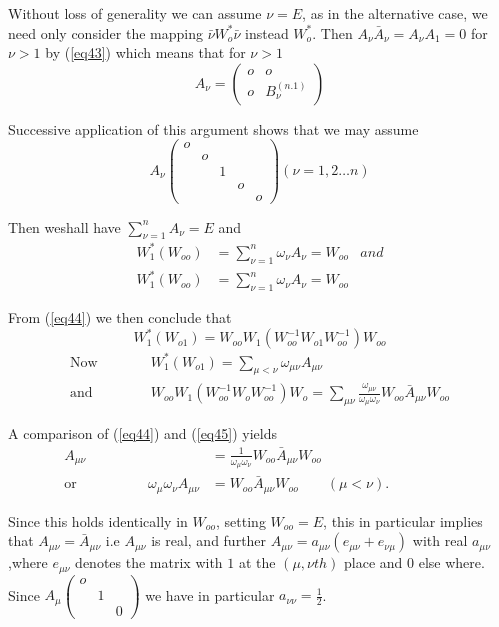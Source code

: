 Without loss of generality we can assume $\nu = E$, as in the
 alternative case, we need only consider the mapping $\bar{\nu} W_o^*
 \bar{\nu}$ instead $W_o^*$.   Then $A_\nu \bar{A}_\nu = A_\nu A_1 =
 0$ for $\nu > 1$ by (\ref{eq43}) which means that for $\nu > 1$  
 $$
 A_\nu = \begin{pmatrix}  o & o \\ o & B^{(n.1)}_\nu\end{pmatrix} 
 $$
 
 Successive application of this argument shows that we may assume
 $$
 A_\nu \begin{pmatrix} o & & & & \\ & o & & & \\ & & 1 & \\ & & &
   o\\ & & & & o\end{pmatrix} (\nu = 1,2 \dots n) 
 $$
 
 Then we\pageoriginale shall have $\sum_{\nu=1}^n A_\nu = E$ and 
 \begin{align*}
W^*_1 (W_{oo}) &=\sum^n_{\nu=1} \omega_\nu A_\nu = W_{oo} & and \\
W^*_1 (W_{oo}) &=\sum^n_{\nu=1} \omega_\nu A_\nu = W_{oo}   
 \end{align*} 
 
 From (\ref{eq44}) we then conclude that 
 $$
 W^*_1 (W_{o1}) = W_{oo} W_1 (W_{oo}^{-1} W_{o1} W_{oo}^{-1}) W_{oo}  
 $$
 \begin{align*}
\text{Now}\quad  \qquad  & W^*_1 (W_{o1}) = \sum_{\mu < \nu}
\omega_{\mu \nu} A_{\mu 
  \nu} \qquad \qquad \tag{44}\label{eq44}  \\
\text{and } \qquad \quad & W_{oo} W_1 (W_{oo}^{-1} W_o W_{oo}^{-1})
W_o = \sum_{\mu 
  \nu} \frac{\omega _{\mu \nu}}{\omega_\mu \omega_\nu} W_{oo}
\bar{A}_{\mu \nu}  W_{oo} \tag{45}\label{eq45}  
 \end{align*}
 
 A comparison of (\ref{eq44}) and (\ref{eq45}) yields
 \begin{align*}
A_{\mu \nu} & = \frac{1}{\omega_\mu \omega_\nu} W_{oo} \bar{A}_{\mu
  \nu} W_{oo}\\ 
\text{or }  \hspace{2cm} \omega_\mu \omega_\nu A_{\mu \nu} & = W_{oo}
\bar{A}_{\mu \nu} W_{oo}   \qquad (\mu < \nu). \hspace{2cm}
 \end{align*}
  
 Since this holds identically in $W_{oo}$, setting $W_{oo} =E$, this
 in particular implies that $A_{\mu \nu} = \bar{A}_{\mu \nu}$ i.e
 $A_{\mu \nu}$ is real, and further $A_{\mu \nu} = a_{\mu\nu} (e_{\mu
   \nu} + e_{\nu \mu})$ with real $a_{\mu \nu}$,where $e_{\mu \nu}$
 denotes the matrix with $1$ at the $(\mu, \nu th)$ place and $0$ else
 where. Since $A_\mu \begin{pmatrix}  o & & \\ & 1 & \\ & &
   0\end{pmatrix}$ we have in particular $a_{\nu \nu} = \frac{1}{2}$. 
 
